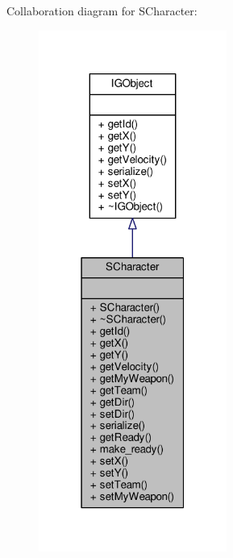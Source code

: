 Collaboration diagram for S\+Character\+:\nopagebreak
\begin{figure}[H]
\begin{center}
\leavevmode
\includegraphics[width=175pt]{class_s_character__coll__graph}
\end{center}
\end{figure}
